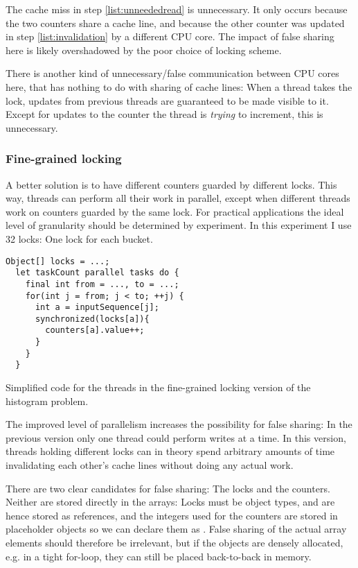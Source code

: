 The cache miss in step \ref{list:unneededread} is unnecessary. It only occurs
because the two counters share a cache line, and because the other counter was
updated in step \ref{list:invalidation} by a different CPU core. The impact of
false sharing here is likely overshadowed by the poor choice of locking scheme.

There is another kind of unnecessary/false communication between CPU cores here,
that has nothing to do with sharing of cache lines: When a thread takes the
lock, updates from previous threads are guaranteed to be made visible to it.
Except for updates to the counter the thread is \textit{trying} to increment,
this is unnecessary.

\subsubsection{Fine-grained locking}
A better solution is to have different counters guarded by different locks. This
way, threads can perform all their work in parallel, except when different
threads work on counters guarded by the same lock. For practical applications
the ideal level of granularity should be determined by experiment. In this
experiment I use 32 locks: One lock for each bucket.

\begin{code}
\begin{Verbatim}[frame=single]
  Object[] locks = ...;
  let taskCount parallel tasks do {
    final int from = ..., to = ...;
    for(int j = from; j < to; ++j) {
      int a = inputSequence[j];
      synchronized(locks[a]){
        counters[a].value++;
      }
    }
  }
\end{Verbatim}
	\caption{Simplified code for the threads in the fine-grained locking
	version of the histogram problem.}
\end{code}

The improved level of parallelism increases the possibility for false sharing: In
the previous version only one thread could perform writes at a time. In this
version, threads holding different locks can in theory spend arbitrary amounts
of time invalidating each other's cache lines without doing any actual work.

There are two clear candidates for false sharing: The locks and the counters.
Neither are stored directly in the arrays: Locks must be object types, and are
hence stored as references, and the integers used for the counters are stored in
placeholder objects so we can declare them as . False sharing
of the actual array elements should therefore be irrelevant, but if the objects
are densely allocated, e.g. in a tight for-loop, they can still be placed
back-to-back in memory.

